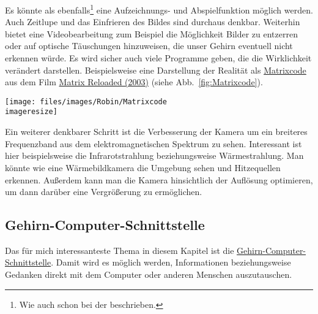 
Es könnte als ebenfalls\footnote{Wie auch schon bei der
 beschrieben.} eine Aufzeichnungs- und Abspielfunktion möglich
werden. Auch Zeitlupe und das Einfrieren des Bildes sind durchaus denkbar. Weiterhin bietet eine
Videobearbeitung zum Beispiel die Möglichkeit Bilder zu entzerren oder auf optische Täuschungen
hinzuweisen, die unser Gehirn eventuell nicht erkennen würde. Es wird sicher auch viele Programme
geben, die die Wirklichkeit verändert darstellen. Beispielsweise eine Darstellung der Realität als
\href{http://www.tony5m17h.net/MatrixCode.gif}{Matrixcode}
aus dem Film \href{http://www.imdb.de/title/tt0234215/}{Matrix Reloaded (2003)} (siehe
Abb.~\vref{fig:Matrixcode}).

\begin{figurewrapper} %
	\texttt{[image: files/images/Robin/Matrixcode\\imageresize]}
	\label{fig:Matrixcode}
\end{figurewrapper}

Ein weiterer denkbarer Schritt ist die Verbesserung der Kamera um ein breiteres Frequenzband aus dem
elektromagnetischen Spektrum zu sehen. Interessant ist hier beispielsweise die Infrarotstrahlung
beziehungsweise Wärmestrahlung. Man könnte wie eine Wärmebildkamera die Umgebung sehen und
Hitzequellen erkennen. Außerdem kann man die Kamera hinsichtlich der Auflösung optimieren, um dann
darüber eine Vergrößerung zu ermöglichen.%

\subsection{Gehirn-Computer-Schnittstelle}
\label{sec:Robin:future:BCI}
Das für mich interessanteste Thema in diesem Kapitel ist die
\href{http://de.wikipedia.org/wiki/Brain-Computer-Interface}{Gehirn-Computer-Schnittstelle}.
Damit wird es möglich werden, Informationen beziehungsweise Gedanken direkt mit dem Computer oder
anderen Menschen auszutauschen.

